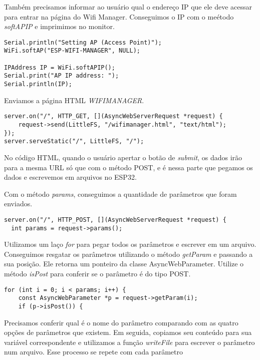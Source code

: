Também precisamos informar ao usuário qual o endereço IP que ele deve acessar para entrar na página do Wifi Manager. Conseguimos o IP com o meétodo \textit{softAPIP} e imprimimos no monitor.

\begin{lstlisting}
Serial.println("Setting AP (Access Point)");
WiFi.softAP("ESP-WIFI-MANAGER", NULL);

IPAddress IP = WiFi.softAPIP();
Serial.print("AP IP address: ");
Serial.println(IP);
\end{lstlisting}

Enviamos a página HTML \textit{WIFIMANAGER}.

\begin{lstlisting}
server.on("/", HTTP_GET, [](AsyncWebServerRequest *request) {
    request->send(LittleFS, "/wifimanager.html", "text/html");
});
server.serveStatic("/", LittleFS, "/");
\end{lstlisting}

No código HTML, quando o usuário apertar o botão de \textit{submit}, os dados irão para a mesma URL só que com o método POST, e é nessa parte que pegamos os dados e escrevemos em arquivos no ESP32.

Com o método \textit{params}, conseguimos a quantidade de parâmetros que foram enviados.

\begin{lstlisting}
server.on("/", HTTP_POST, [](AsyncWebServerRequest *request) {
  int params = request->params();
\end{lstlisting}

Utilizamos um laço \textit{for} para pegar todos os parâmetros e escrever em um arquivo. Conseguimos resgatar os parâmetros utilizando o método \textit{getParam} e passando a sua posição. Ele retorna um ponteiro da classe AsyncWebParameter. Utilize o método \textit{isPost} para conferir se o parâmetro é do tipo POST.

\begin{lstlisting}
for (int i = 0; i < params; i++) {
    const AsyncWebParameter *p = request->getParam(i);
    if (p->isPost()) {
\end{lstlisting}

Precisamos conferir qual é o nome do parâmetro comparando com as quatro opções de parâmetros que existem. Em seguida, copiamos seu conteúdo para sua variável correspondente e utilizamos a função \textit{writeFile} para escrever o parâmetro num arquivo. Esse processo se repete com cada parâmetro

